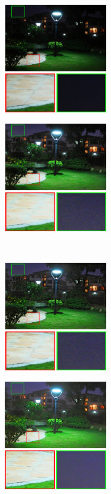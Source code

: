 \begin{figure}[htbp]
\centering
	\begin{minipage}[b]{0.49\hsize}
		\centering
		\includegraphics[width=64mm, height=48mm]{images/experiment/qualitative/comp2/input.eps}
		 \label{fig:qualitative/2/input}
	\end{minipage}
	\begin{minipage}[b]{0.49\hsize}
		\centering
		\includegraphics[width=64mm, height=48mm]{images/experiment/qualitative/comp2/srie.eps}
		 \label{fig:qualitative/2/srie}
	\end{minipage} \\
	\begin{minipage}[b]{0.49\hsize}
		\centering
		\includegraphics[width=64mm, height=48mm]{images/experiment/qualitative/comp2/wvm.eps}
		 \label{fig:qualitative/2/wvm}
	\end{minipage}
	\begin{minipage}[b]{0.49\hsize}
		\centering
		\includegraphics[width=64mm, height=48mm]{images/experiment/qualitative/comp2/rrm.eps}

\end{minipage}
\end{figure}
